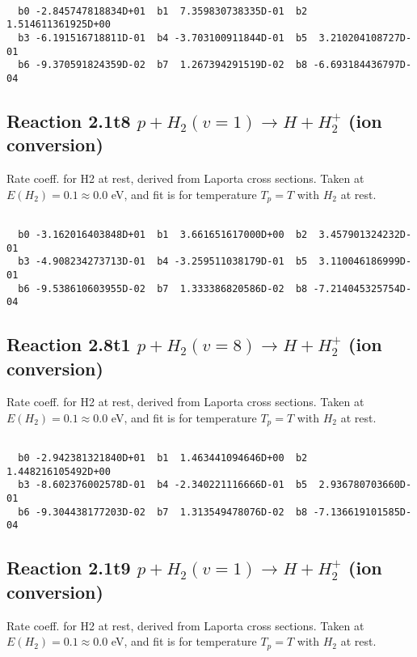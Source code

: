 \begin{small}\begin{verbatim}

  b0 -2.845747818834D+01  b1  7.359830738335D-01  b2  1.514611361925D+00
  b3 -6.191516718811D-01  b4 -3.703100911844D-01  b5  3.210204108727D-01
  b6 -9.370591824359D-02  b7  1.267394291519D-02  b8 -6.693184436797D-04

\end{verbatim}\end{small}

\newpage
\subsection{
Reaction 2.1t8
$ p + H_2(v=1) \rightarrow H + H_2^+$ (ion conversion)
}
Rate coeff. for H2 at rest, derived from Laporta cross sections.
Taken at $E(H_2) = 0.1 \approx 0.0$ eV,  and fit is for temperature $T_p=T$ with $H_2$ at rest.

\begin{small}\begin{verbatim}

  b0 -3.162016403848D+01  b1  3.661651617000D+00  b2  3.457901324232D-01
  b3 -4.908234273713D-01  b4 -3.259511038179D-01  b5  3.110046186999D-01
  b6 -9.538610603955D-02  b7  1.333386820586D-02  b8 -7.214045325754D-04

\end{verbatim}\end{small}

\newpage
\subsection{
Reaction 2.8t1
$ p + H_2(v=8) \rightarrow H + H_2^+$ (ion conversion)
}
Rate coeff. for H2 at rest, derived from Laporta cross sections.
Taken at $E(H_2) = 0.1 \approx 0.0$ eV,  and fit is for temperature $T_p=T$ with $H_2$ at rest.

\begin{small}\begin{verbatim}

  b0 -2.942381321840D+01  b1  1.463441094646D+00  b2  1.448216105492D+00
  b3 -8.602376002578D-01  b4 -2.340221116666D-01  b5  2.936780703660D-01
  b6 -9.304438177203D-02  b7  1.313549478076D-02  b8 -7.136619101585D-04

\end{verbatim}\end{small}

\newpage
\subsection{
Reaction 2.1t9
$ p + H_2(v=1) \rightarrow H + H_2^+$ (ion conversion)
}
Rate coeff. for H2 at rest, derived from Laporta cross sections.
Taken at $E(H_2) = 0.1 \approx 0.0$ eV,  and fit is for temperature $T_p=T$ with $H_2$ at rest.

